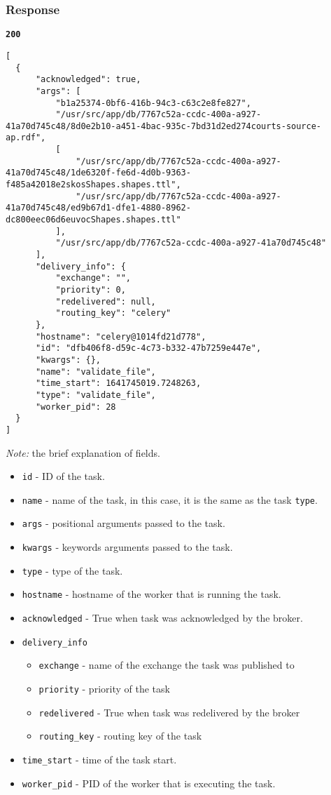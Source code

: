 \subsubsection{Response}
\textbf{\texttt{200}}
\begin{lstlisting}
[
  {
      "acknowledged": true,
      "args": [
          "b1a25374-0bf6-416b-94c3-c63c2e8fe827",
          "/usr/src/app/db/7767c52a-ccdc-400a-a927-41a70d745c48/8d0e2b10-a451-4bac-935c-7bd31d2ed274courts-source-ap.rdf",
          [
              "/usr/src/app/db/7767c52a-ccdc-400a-a927-41a70d745c48/1de6320f-fe6d-4d0b-9363-f485a42018e2skosShapes.shapes.ttl",
              "/usr/src/app/db/7767c52a-ccdc-400a-a927-41a70d745c48/ed9b67d1-dfe1-4880-8962-dc800eec06d6euvocShapes.shapes.ttl"
          ],
          "/usr/src/app/db/7767c52a-ccdc-400a-a927-41a70d745c48"
      ],
      "delivery_info": {
          "exchange": "",
          "priority": 0,
          "redelivered": null,
          "routing_key": "celery"
      },
      "hostname": "celery@1014fd21d778",
      "id": "dfb406f8-d59c-4c73-b332-47b7259e447e",
      "kwargs": {},
      "name": "validate_file",
      "time_start": 1641745019.7248263,
      "type": "validate_file",
      "worker_pid": 28
  }
]
\end{lstlisting}

\textit{Note:} the brief explanation of fields.
\begin{itemize}
  \item \texttt{id} - ID of the task.
  \item \texttt{name} - name of the task, in this case, it is the same as the task \texttt{type}.
  \item \texttt{args} - positional arguments passed to the task.
  \item \texttt{kwargs} - keywords arguments passed to the task.
  \item \texttt{type} - type of the task.
  \item \texttt{hostname} - hostname of the worker that is running the task.
  \item \texttt{acknowledged} - True when task was acknowledged by the broker.
  \item \texttt{delivery\_info}
        \begin{itemize}
          \item \texttt{exchange} - name of the exchange the task was published to
          \item \texttt{priority} - priority of the task
          \item \texttt{redelivered} - True when task was redelivered by the broker
          \item \texttt{routing\_key} - routing key of the task
        \end{itemize}
  \item \texttt{time\_start} - time of the task start.
  \item \texttt{worker\_pid} - PID of the worker that is executing the task.
\end{itemize}

